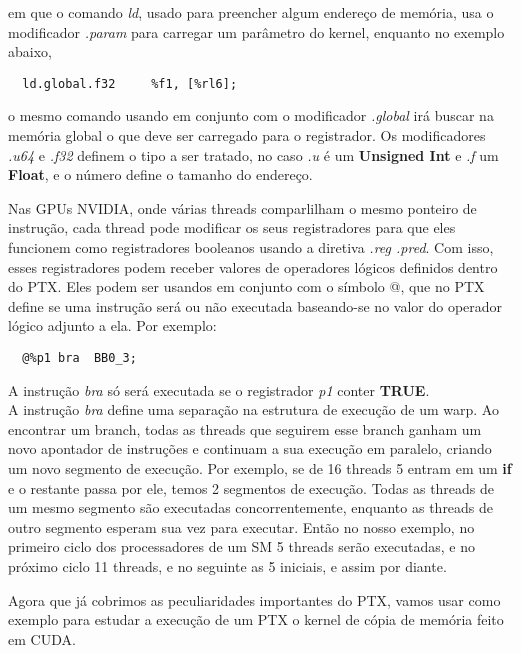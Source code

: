 em que o comando \textit{ld}, usado para preencher algum endereço de memória, usa o modificador \textit{.param} para carregar um parâmetro do kernel,
enquanto no exemplo abaixo,

\begin{lstlisting}
  ld.global.f32 	%f1, [%rl6];
\end{lstlisting}

o mesmo comando usando em conjunto com o modificador \textit{.global} irá buscar na memória global o que deve ser carregado para o registrador.
Os modificadores \textit{.u64} e \textit{.f32} definem o tipo a ser tratado, no caso \textit{.u} é um \textbf{Unsigned Int} e \textit{.f} um
\textbf{Float}, e o número define o tamanho do endereço. 

Nas GPUs NVIDIA, onde várias threads comparlilham o mesmo ponteiro de instrução, cada thread pode modificar os seus registradores para que eles 
funcionem como registradores booleanos usando a diretiva \textit{.reg .pred}. Com isso, esses registradores podem receber valores de operadores
lógicos definidos dentro do PTX. Eles podem ser usandos em conjunto com o símbolo @, que no PTX define se uma instrução será ou não executada
baseando-se no valor do operador lógico adjunto a ela.
Por exemplo:

\begin{lstlisting}
  @%p1 bra 	BB0_3;
\end{lstlisting} 

A instrução \textit{bra} só será executada se o registrador \textit{p1} conter \textbf{TRUE}. \\

A instrução \textit{bra} define uma separação na estrutura de execução de um warp. Ao encontrar um branch, todas as threads que seguirem esse branch 
ganham um novo apontador de instruções e continuam a sua execução em paralelo, criando um novo segmento de execução. Por exemplo, se de 16 threads 
5 entram em um \textbf{if} e o restante passa por ele, temos 2 segmentos de execução. Todas as threads de um mesmo segmento são executadas concorrentemente, 
enquanto as threads de outro segmento esperam sua vez para executar. Então no nosso exemplo, no primeiro ciclo dos processadores de um SM 5 threads serão
executadas, e no próximo ciclo 11 threads, e no seguinte as 5 iniciais, e assim por diante.
 
Agora que já cobrimos as peculiaridades importantes do PTX, vamos usar como exemplo para estudar a execução de um PTX o kernel de cópia de memória feito
em CUDA.

